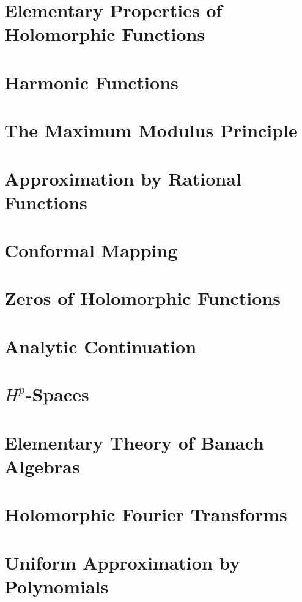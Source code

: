 \documentclass[oneside]{amsbook}
\numberwithin{ex}{chapter}
\begin{document}
\chapter{Elementary Properties of Holomorphic Functions}


\chapter{Harmonic Functions}


\chapter{The Maximum Modulus Principle}


\chapter{Approximation by Rational Functions}


\chapter{Conformal Mapping}


\chapter{Zeros of Holomorphic Functions}


\chapter{Analytic Continuation}


\chapter{$H^p$-Spaces}


\chapter{Elementary Theory of Banach Algebras}


\chapter{Holomorphic Fourier Transforms}


\chapter{Uniform Approximation by Polynomials}

\end{document}
